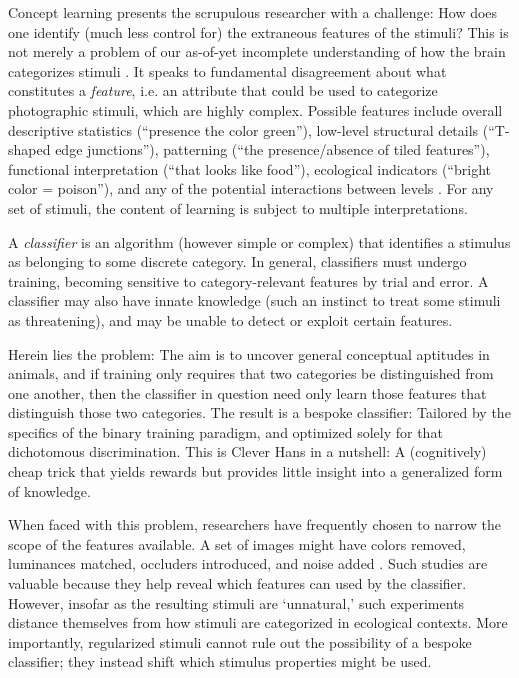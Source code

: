 \documentclass[fleqn,10pt]{wlpeerj_noabs}
\begin{document}
Concept learning presents the scrupulous researcher with a challenge: How does one identify (much less control for) the extraneous features of the stimuli? This is not merely a problem of our as-of-yet incomplete understanding of how the brain categorizes stimuli \citep{Free2011}. It speaks to fundamental disagreement about what constitutes a \textsl{feature}, i.e. an attribute that could be used to categorize photographic stimuli, which are highly complex. Possible features include overall descriptive statistics (``presence the color green''), low-level structural details (``T-shaped edge junctions''), patterning (``the presence/absence of tiled features''), functional interpretation (``that looks like food''), ecological indicators (``bright color = poison''), and any of the potential interactions between levels \citep[cf.][]{Spal2000, Mars2008}. For any set of stimuli, the content of learning is subject to multiple interpretations.

A \textsl{classifier} is an algorithm (however simple or complex) that identifies a stimulus as belonging to some discrete category. In general, classifiers must undergo training, becoming sensitive to category-relevant features by trial and error. A classifier may also have innate knowledge (such an instinct to treat some stimuli as threatening), and may be unable to detect or exploit certain features.

Herein lies the problem: The aim is to uncover general conceptual aptitudes in animals, and if training only requires that two categories be distinguished from one another, then the classifier in question need only learn those features that distinguish those two categories. The result is a bespoke classifier: Tailored by the specifics of the binary training paradigm, and optimized solely for that dichotomous discrimination. This is Clever Hans in a nutshell: A (cognitively) cheap trick that yields rewards but provides little insight into a generalized form of knowledge.

When faced with this problem, researchers have frequently chosen to narrow the scope of the features available. A set of images might have colors removed, luminances matched, occluders introduced, and noise added \citep[e.g.][]{Basi2013}. Such studies are valuable because they help reveal which features can used by the classifier. However, insofar as the resulting stimuli are `unnatural,' such experiments distance themselves from how stimuli are categorized in ecological contexts. More importantly, regularized stimuli cannot rule out the possibility of a bespoke classifier; they instead shift which stimulus properties might be used.
\end{document}
